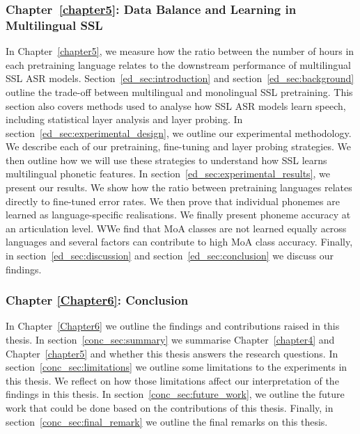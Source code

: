 \newpage
\subsubsection{Chapter~\ref{chapter5}: Data Balance and Learning in Multilingual SSL}
In Chapter~\ref{chapter5}, we measure how the ratio between the number of hours in each pretraining language relates to the downstream performance of multilingual SSL ASR models. Section~\ref{ed_sec:introduction} and section~\ref{ed_sec:background} outline the trade-off between multilingual and monolingual SSL pretraining. This section also covers methods used to analyse how SSL ASR models learn speech, including statistical layer analysis and layer probing. In section~\ref{ed_sec:experimental_design}, we outline our experimental methodology. We describe each of our pretraining, fine-tuning and layer probing strategies. We then outline how we will use these strategies to understand how SSL learns multilingual phonetic features. In section~\ref{ed_sec:experimental_results}, we present our results. We show how the ratio between pretraining languages relates directly to fine-tuned error rates. We then prove that individual phonemes are learned as language-specific realisations. We finally present phoneme accuracy at an articulation level. WWe find that MoA classes are not learned equally across languages and several factors can contribute to high MoA class accuracy. Finally, in section~\ref{ed_sec:discussion} and section~\ref{ed_sec:conclusion} we discuss our findings. 


\subsubsection{Chapter \ref{Chapter6}: Conclusion}
In Chapter~\ref{Chapter6} we outline the findings and contributions raised in this thesis. In section~\ref{conc_sec:summary} we summarise Chapter~\ref{chapter4} and Chapter~\ref{chapter5} and whether this thesis answers the research questions. In section~\ref{conc_sec:limitations} we outline some limitations to the experiments in this thesis. We reflect on how those limitations affect our interpretation of the findings in this thesis. In section~\ref{conc_sec:future_work}, we outline the future work that could be done based on the contributions of this thesis. Finally, in section~\ref{conc_sec:final_remark} we outline the final remarks on this thesis.

